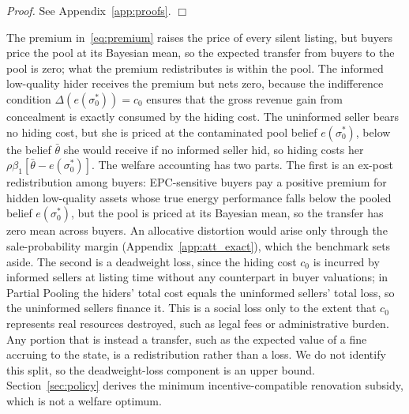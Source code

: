 \noindent\textit{Proof.} See Appendix~\ref{app:proofs}. $\Box$

The premium in~\eqref{eq:premium} raises the price of every silent listing, but buyers price the pool at its Bayesian mean, so the expected transfer from buyers to the pool is zero; what the premium redistributes is within the pool. The informed low-quality hider receives the premium but nets zero, because the indifference condition $\Delta(e(\sigma_0^*))=c_0$ ensures that the gross revenue gain from concealment is exactly consumed by the hiding cost. The uninformed seller bears no hiding cost, but she is priced at the contaminated pool belief $e(\sigma_0^*)$, below the belief $\bar\theta$ she would receive if no informed seller hid, so hiding costs her $\rho\beta_1[\bar\theta-e(\sigma_0^*)]$. The welfare accounting has two parts. The first is an ex-post redistribution among buyers: EPC-sensitive buyers pay a positive premium for hidden low-quality assets whose true energy performance falls below the pooled belief $e(\sigma_0^*)$, but the pool is priced at its Bayesian mean, so the transfer has zero mean across buyers. An allocative distortion would arise only through the sale-probability margin (Appendix~\ref{app:att_exact}), which the benchmark sets aside. The second is a deadweight loss, since the hiding cost $c_0$ is incurred by informed sellers at listing time without any counterpart in buyer valuations; in Partial Pooling the hiders' total cost equals the uninformed sellers' total loss, so the uninformed sellers finance it. This is a social loss only to the extent that $c_0$ represents real resources destroyed, such as legal fees or administrative burden. Any portion that is instead a transfer, such as the expected value of a fine accruing to the state, is a redistribution rather than a loss. We do not identify this split, so the deadweight-loss component is an upper bound. Section~\ref{sec:policy} derives the minimum incentive-compatible renovation subsidy, which is not a welfare optimum.
